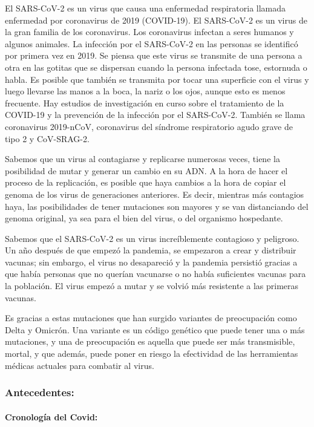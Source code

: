 \documentclass[
  12pt,
]{article}
\begin{document}
El SARS-CoV-2 es un virus que causa una enfermedad respiratoria llamada
enfermedad por coronavirus de 2019 (COVID-19). El SARS-CoV-2 es un virus
de la gran familia de los coronavirus. Los coronavirus infectan a seres
humanos y algunos animales. La infección por el SARS-CoV-2 en las
personas se identificó por primera vez en 2019. Se piensa que este virus
se transmite de una persona a otra en las gotitas que se dispersan
cuando la persona infectada tose, estornuda o habla. Es posible que
también se transmita por tocar una superficie con el virus y luego
llevarse las manos a la boca, la nariz o los ojos, aunque esto es menos
frecuente. Hay estudios de investigación en curso sobre el tratamiento
de la COVID-19 y la prevención de la infección por el SARS-CoV-2.
También se llama coronavirus 2019-nCoV, coronavirus del síndrome
respiratorio agudo grave de tipo 2 y CoV-SRAG-2.

Sabemos que un virus al contagiarse y replicarse numerosas veces, tiene
la posibilidad de mutar y generar un cambio en su ADN. A la hora de
hacer el proceso de la replicación, es posible que haya cambios a la
hora de copiar el genoma de los virus de generaciones anteriores. Es
decir, mientras más contagios haya, las posibilidades de tener
mutaciones son mayores y se van distanciando del genoma original, ya sea
para el bien del virus, o del organismo hospedante.

Sabemos que el SARS-CoV-2 es un virus increíblemente contagioso y
peligroso. Un año después de que empezó la pandemia, se empezaron a
crear y distribuir vacunas; sin embargo, el virus no desapareció y la
pandemia persistió gracias a que había personas que no querían vacunarse
o no había suficientes vacunas para la población. El virus empezó a
mutar y se volvió más resistente a las primeras vacunas.

Es gracias a estas mutaciones que han surgido variantes de preocupación
como Delta y Omicrón. Una variante es un código genético que puede tener
una o más mutaciones, y una de preocupación es aquella que puede ser más
transmisible, mortal, y que además, puede poner en riesgo la efectividad
de las herramientas médicas actuales para combatir al virus.

\hypertarget{antecedentes}{%
\subsubsection{Antecedentes:}\label{antecedentes}}

\hypertarget{cronologuxeda-del-covid}{%
\paragraph{\texorpdfstring{\textbf{Cronología del
Covid:}}{Cronología del Covid:}}\label{cronologuxeda-del-covid}}
\end{document}
